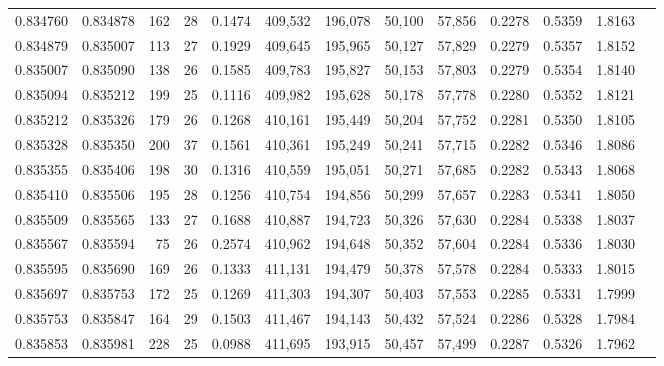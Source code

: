 \begin{tabular}{rrrrrrrrrrrrr}
0.834760 & 0.834878 &   162 &  28 &                                     0.1474 & 409,532 & 196,078 &  50,100 &  57,856 & 0.2278 & 0.5359 & 1.8163 \\
0.834879 & 0.835007 &   113 &  27 &                                     0.1929 & 409,645 & 195,965 &  50,127 &  57,829 & 0.2279 & 0.5357 & 1.8152 \\
0.835007 & 0.835090 &   138 &  26 &                                     0.1585 & 409,783 & 195,827 &  50,153 &  57,803 & 0.2279 & 0.5354 & 1.8140 \\
0.835094 & 0.835212 &   199 &  25 &                                     0.1116 & 409,982 & 195,628 &  50,178 &  57,778 & 0.2280 & 0.5352 & 1.8121 \\
0.835212 & 0.835326 &   179 &  26 &                                     0.1268 & 410,161 & 195,449 &  50,204 &  57,752 & 0.2281 & 0.5350 & 1.8105 \\
0.835328 & 0.835350 &   200 &  37 &                                     0.1561 & 410,361 & 195,249 &  50,241 &  57,715 & 0.2282 & 0.5346 & 1.8086 \\
0.835355 & 0.835406 &   198 &  30 &                                     0.1316 & 410,559 & 195,051 &  50,271 &  57,685 & 0.2282 & 0.5343 & 1.8068 \\
0.835410 & 0.835506 &   195 &  28 &                                     0.1256 & 410,754 & 194,856 &  50,299 &  57,657 & 0.2283 & 0.5341 & 1.8050 \\
0.835509 & 0.835565 &   133 &  27 &                                     0.1688 & 410,887 & 194,723 &  50,326 &  57,630 & 0.2284 & 0.5338 & 1.8037 \\
0.835567 & 0.835594 &    75 &  26 &                                     0.2574 & 410,962 & 194,648 &  50,352 &  57,604 & 0.2284 & 0.5336 & 1.8030 \\
0.835595 & 0.835690 &   169 &  26 &                                     0.1333 & 411,131 & 194,479 &  50,378 &  57,578 & 0.2284 & 0.5333 & 1.8015 \\
0.835697 & 0.835753 &   172 &  25 &                                     0.1269 & 411,303 & 194,307 &  50,403 &  57,553 & 0.2285 & 0.5331 & 1.7999 \\
0.835753 & 0.835847 &   164 &  29 &                                     0.1503 & 411,467 & 194,143 &  50,432 &  57,524 & 0.2286 & 0.5328 & 1.7984 \\
0.835853 & 0.835981 &   228 &  25 &                                     0.0988 & 411,695 & 193,915 &  50,457 &  57,499 & 0.2287 & 0.5326 & 1.7962 \\

\end{tabular}
